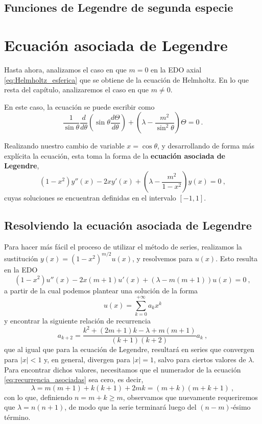 \subsection{Funciones de Legendre de segunda especie}


\section{Ecuación asociada de Legendre}

Hasta ahora, analizamos el caso en que $m=0$ en la EDO axial \eqref{eq:Helmholtz_esferica} que se obtiene de la ecuación de Helmholtz. En lo que resta del capítulo, analizaremos el caso en que $m \neq 0$.

En este caso, la ecuación se puede escribir como
\begin{equation}
    \frac{1}{\sin\theta} \frac{d}{d\theta}\left( \sin\theta \frac{d\Theta}{d\theta} \right) + \left(\lambda - \frac{m^2}{\sin^2\theta} \right) \Theta = 0 \ .
\end{equation}

Realizando nuestro cambio de variable $x = \cos\theta$, y desarrollando de forma más explícita la ecuación, esta toma la forma de la \textbf{ecuación asociada de Legendre},
\begin{equation}
    (1-x^2) y''(x) - 2xy'(x) + \left( \lambda - \frac{m^2}{1-x^2} \right) y(x) = 0 \ ,
\end{equation}
cuyas soluciones se encuentran definidas en el intervalo $[-1,1]$.

\subsection{Resolviendo la ecuación asociada de Legendre}

Para hacer más fácil el proceso de utilizar el método de series, realizamos la sustitución $y(x) = (1-x^2)^{m/2} u(x)$, y resolvemos para $u(x)$. Esto resulta en la EDO
\begin{equation}
    (1-x^2)u''(x) - 2x(m+1)u'(x) + (\lambda - m(m+1))u(x) = 0 \ ,
\end{equation}
a partir de la cual podemos plantear una solución de la forma
\begin{equation}
    u(x) = \sum_{k=0}^{+\infty} a_k x^k 
\end{equation} 
y encontrar la siguiente relación de recurrencia
\begin{equation}\label{eq:recurrencia_asociadas}
    a_{k+2} = \frac{k^2 + (2m+1)k - \lambda + m(m+1)}{(k+1)(k+2)} a_k \ ,
\end{equation}
que al igual que para la ecuación de Legendre, resultará en series que convergen para $|x|<1$ y, en general, divergen para $|x|=1$, salvo para ciertos valores de $\lambda$. Para encontrar dichos valores, necesitamos que el numerador de la ecuación \eqref{eq:recurrencia_asociadas} sea cero, es decir,
\begin{equation}
    \lambda = m(m+1) + k(k+1) + 2mk = (m+k)(m+k+1) \ ,
\end{equation}
con lo que, definiendo $n = m+k \geq m$, observamos que nuevamente requeriremos que $\lambda = n(n+1)$, de modo que la serie terminará luego del $(n-m)$-ésimo término.

